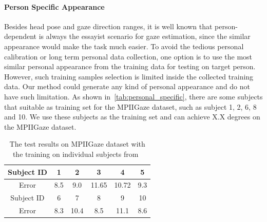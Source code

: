 \paragraph{Person Specific Appearance}
Besides head pose and gaze direction ranges, it is well known that person-dependent is always the essayist scenario for gaze estimation, since the similar appearance would make the task much easier. To avoid the tedious personal calibration or long term personal data collection, one option is to use the most similar personal appearance from the training data for testing on target person. However, such training samples selection is limited inside the collected training data. Our method could generate any kind of personal appearance and do not have such limitation. As shown in~\autoref{tab:personal_specific}, there are some subjects that suitable as training set for the MPIIGaze dataset, such as subject 1, 2, 6, 8 and 10. We use these subjects as the training set and can achieve X.X degrees on the MPIIGaze dataset.


\begin{table}
\begin{center}
\begin{tabular}{ |c|c|c|c|c|c| } 
 \hline
 Subject ID & 1 & 2 & 3 & 4& 5 \\ 
 \hline
 Error & 8.5 & 9.0 & 11.65 & 10.72 & 9.3 \\ 
 \hline
 \hline
 Subject ID & 6 & 7 & 8 & 9 & 10 \\ 
 \hline
 Error & 8.3 & 10.4 & 8.5 & 11.1 & 8.6 \\ 
 \hline
\end{tabular}
\caption{The test results on MPIIGaze dataset with the training on individual subjects from~\dataset}
\label{tab:personal_specific}
\end{center}
\end{table}


